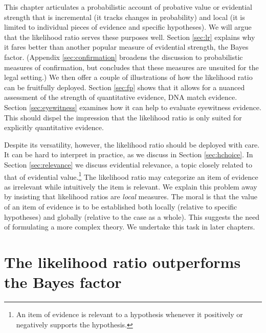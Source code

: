 \documentclass[
  10pt,
  dvipsnames,enabledeprecatedfontcommands]{scrartcl}
\begin{document}
This chapter articulates a probabilistic account of probative value or
evidential strength that is incremental (it tracks changes in
probability) and local (it is limited to individual pieces of evidence
and specific hypotheses). We will argue that the likelihood ratio serves
these purposes well. Section \ref{sec:lr} explains why it fares better
than another popular measure of evidential strength, the Bayes factor.
(Appendix \ref{sec:confirmation} broadens the discussion to
probabilistic measures of confirmation, but concludes that these
measures are unsuited for the legal setting.) We then offer a couple of
illustrations of how the likelihood ratio can be fruitfully deployed.
Section \ref{sec:fp} shows that it allows for a nuanced assessment of
the strength of quantitative evidence, DNA match evidence. Section
\ref{sec:eyewitness} examines how it can help to evaluate eyewitness
evidence. This should dispel the impression that the likelihood ratio is
only suited for explicitly quantitative evidence.

Despite its versatility, however, the likelihood ratio should be
deployed with care. It can be hard to interpret in practice, as we
discuss in Section \ref{sec:hchoice}. In Section \ref{sec:relevance} we
discuss evidential relevance, a topic closely related to that of
evidential value.\footnote{An item of evidence is relevant to a
  hypothesis whenever it positively or negatively supports the
  hypothesis.} The likelihood ratio may categorize an item of evidence
as irrelevant while intuitively the item is relevant. We explain this
problem away by insisting that likelihood ratios are \textit{local}
measures. The moral is that the value of an item of evidence is to be
established both locally (relative to specific hypotheses) and globally
(relative to the case as a whole). This suggests the need of formulating
a more complex theory. We undertake this task in later chapters.

\hypertarget{the-likelihood-ratio-outperforms-the-bayes-factor}{%
\section{The likelihood ratio outperforms the Bayes
factor}\label{the-likelihood-ratio-outperforms-the-bayes-factor}}

\label{sec:lr}
\end{document}
